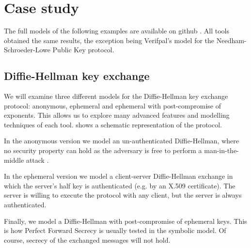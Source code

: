 
\section{Case study}
\label{section:case-study}

The full models of the following examples are available on github \cite{CaseStudies}. All tools obtained the same results, the exception being Verifpal's model for the Needham-Schroeder-Lowe Public Key protocol.

\subsection{Diffie-Hellman key exchange}

We will examine three different models for the Diffie-Hellman key exchange protocol: anonymous, ephemeral and ephemeral with post-compromise of exponents. This allows us to explore many advanced features and modelling techniques of each tool.  shows a schematic representation of the protocol.

In the anonymous version we model an un-authenticated Diffie-Hellman, where no security property can hold as the adversary is free to perform a man-in-the-middle attack \cite{MITM-DH}.

In the ephemeral version we model a client-server Diffie-Hellman exchange in which the server's half key is authenticated (e.g. by an X.509 certificate). The server is willing to execute the protocol with any client, but the server is always authenticated.

Finally, we model a Diffie-Hellman with post-compromise of ephemeral keys. This is how Perfect Forward Secrecy \cite{PFS} is usually tested in the symbolic model. Of course, secrecy of the exchanged messages will not hold.

